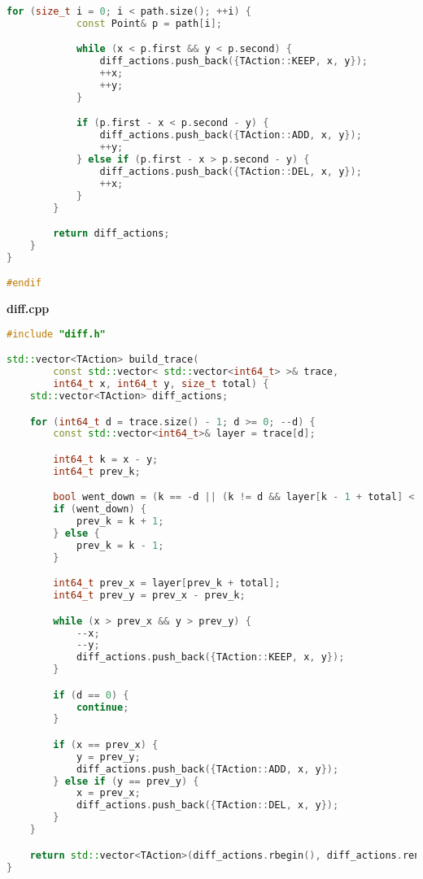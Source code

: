 \begin{lstlisting}[language=C++]
        for (size_t i = 0; i < path.size(); ++i) {
            const Point& p = path[i];

            while (x < p.first && y < p.second) {
                diff_actions.push_back({TAction::KEEP, x, y});
                ++x;
                ++y;
            }

            if (p.first - x < p.second - y) {
                diff_actions.push_back({TAction::ADD, x, y});
                ++y;
            } else if (p.first - x > p.second - y) {
                diff_actions.push_back({TAction::DEL, x, y});
                ++x;
            }
        }

        return diff_actions;
    }
}

#endif
\end{lstlisting}

\textbf{diff.cpp}

\begin{lstlisting}[language=C++]
#include "diff.h"

std::vector<TAction> build_trace(
        const std::vector< std::vector<int64_t> >& trace, 
        int64_t x, int64_t y, size_t total) {
    std::vector<TAction> diff_actions;

    for (int64_t d = trace.size() - 1; d >= 0; --d) {
        const std::vector<int64_t>& layer = trace[d];

        int64_t k = x - y;
        int64_t prev_k;

        bool went_down = (k == -d || (k != d && layer[k - 1 + total] < layer[k + 1 + total]));
        if (went_down) {
            prev_k = k + 1;
        } else {
            prev_k = k - 1;
        }

        int64_t prev_x = layer[prev_k + total];
        int64_t prev_y = prev_x - prev_k;

        while (x > prev_x && y > prev_y) {
            --x;
            --y;
            diff_actions.push_back({TAction::KEEP, x, y});
        }

        if (d == 0) {
            continue;
        }

        if (x == prev_x) {
            y = prev_y;
            diff_actions.push_back({TAction::ADD, x, y});
        } else if (y == prev_y) {
            x = prev_x;
            diff_actions.push_back({TAction::DEL, x, y});
        }
    }

    return std::vector<TAction>(diff_actions.rbegin(), diff_actions.rend());
}
\end{lstlisting}


